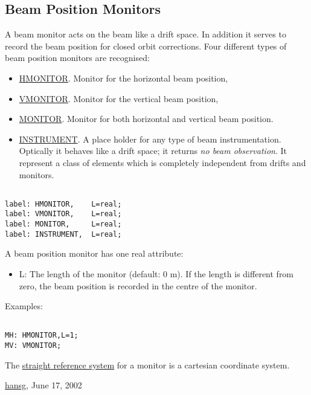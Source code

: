 




\subsection{Beam Position Monitors}
  A beam monitor acts on the beam like a drift space. In addition it serves to record the beam position for closed orbit corrections. Four different types of beam position monitors are recognised: 
\begin{itemize}
	\item \href{hmon}{HMONITOR}. Monitor for the horizontal beam position, 
	\item \href{vmon}{VMONITOR}. Monitor for the vertical beam position, 
	\item \href{mon}{MONITOR}. Monitor for both horizontal and vertical beam position. 
	\item \href{inst}{INSTRUMENT}. A place holder for any type of beam instrumentation. Optically it behaves like a drift space; it returns \emph{no beam observation}. It represent a class of elements which is completely independent from drifts and monitors. 
\end{itemize}
\begin{verbatim}

label: HMONITOR,    L=real;
label: VMONITOR,    L=real;
label: MONITOR,     L=real;
label: INSTRUMENT,  L=real;
\end{verbatim} A beam position monitor has one real attribute: 
\begin{itemize}
	\item L: The length of the monitor (default: 0 m). If the length is different from zero, the beam position is recorded in the centre of the monitor. 
\end{itemize} Examples: 
\begin{verbatim}

MH: HMONITOR,L=1;
MV: VMONITOR;
\end{verbatim} The \href{local_system.html#straight}{straight reference system} for a monitor is a cartesian coordinate system. 

\href{http://www.cern.ch/Hans.Grote/hansg_sign.html}{hansg}, June 17, 2002 

